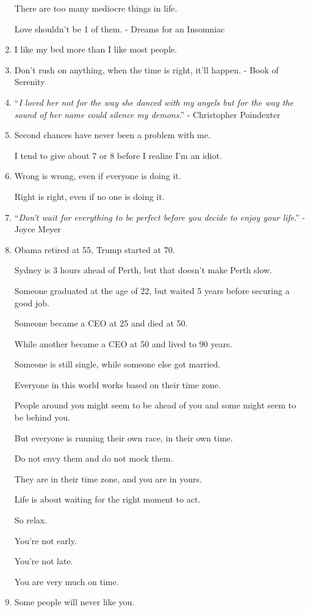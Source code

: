 \documentclass{article}
\begin{document}
\begin{enumerate}
	There are too many mediocre things in life.
	
	Love shouldn't be 1 of them. - Dreams for an Insomniac
	\item I like my bed more than I like most people.
	\item Don't rush on anything, when the time is right, it'll happen. - Book of Serenity
	\item ``\textit{I loved her not for the way she danced with my angels but for the way the sound of her name could silence my demons}.'' - Christopher Poindexter
	\item Second chances have never been a problem with me.
	
	I tend to give about 7 or 8 before I realize I'm an idiot.
	\item Wrong is wrong, even if everyone is doing it.
	
	Right is right, even if no one is doing it.
	\item ``\textit{Don't wait for everything to be perfect before you decide to enjoy your life}.'' - Joyce Meyer
	\item Obama retired at 55, Trump started at 70.
	
	Sydney is 3 hours ahead of Perth, but that doesn't make Perth slow.
	
	Someone graduated at the age of 22, but waited 5 years before securing a good job.
	
	Someone became a CEO at 25 and died at 50.
	
	While another became a CEO at 50 and lived to 90 years.
	
	Someone is still single, while someone else got married.
	
	Everyone in this world works based on their time zone.
	
	People around you might seem to be ahead of you and some might seem to be behind you.
	
	But everyone is running their own race, in their own time.
	
	Do not envy them and do not mock them.
	
	They are in their time zone, and you are in yours.
	
	Life is about waiting for the right moment to act.
	
	So relax.
	
	You're not early.
	
	You're not late.
	
	You are very much on time.
	\item Some people will never like you.
	

\end{enumerate}
\end{document}

